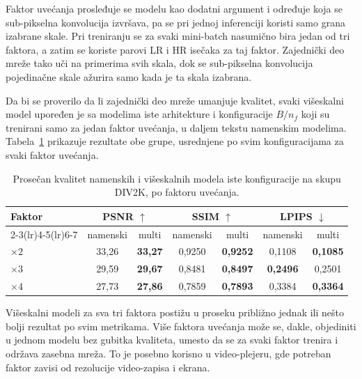 \documentclass[12pt,a4paper]{article}
\begin{document}
Faktor uvećanja prosleđuje se modelu kao dodatni argument i određuje koja se sub-pikselna konvolucija izvršava, pa se pri jednoj inferenciji koristi samo grana izabrane skale. Pri treniranju se za svaki mini-batch nasumično bira jedan od tri faktora, a zatim se koriste parovi LR i HR isečaka za taj faktor. Zajednički deo mreže tako uči na primerima svih skala, dok se sub-pikselna konvolucija pojedinačne skale ažurira samo kada je ta skala izabrana.

Da bi se proverilo da li zajednički deo mreže umanjuje kvalitet, svaki višeskalni model upoređen je sa modelima iste arhitekture i konfiguracije $B/n_f$ koji su trenirani samo za jedan faktor uvećanja, u daljem tekstu namenskim modelima. Tabela~\ref{tab:multiscale_DIV2K} prikazuje rezultate obe grupe, usrednjene po svim konfiguracijama za svaki faktor uvećanja.

\begin{table}[H]
	\centering
	\begingroup
	\small
	\setlength{\tabcolsep}{8pt}
	\renewcommand{\arraystretch}{1.15}
	\begin{tabular}{@{}lcccccc@{}}
		\toprule
		Faktor & \multicolumn{2}{c}{PSNR $\uparrow$} & \multicolumn{2}{c}{SSIM $\uparrow$} & \multicolumn{2}{c}{LPIPS $\downarrow$} \\
		\cmidrule(lr){2-3}\cmidrule(lr){4-5}\cmidrule(lr){6-7}
		& namenski & multi & namenski & multi & namenski & multi \\
		\midrule
		$\times2$ & 33,26 & \textbf{33,27} & 0,9250 & \textbf{0,9252} & 0,1108 & \textbf{0,1085} \\
		$\times3$ & 29,59 & \textbf{29,67} & 0,8481 & \textbf{0,8497} & \textbf{0,2496} & 0,2501 \\
		$\times4$ & 27,73 & \textbf{27,86} & 0,7859 & \textbf{0,7893} & 0,3384 & \textbf{0,3364} \\
		\bottomrule
	\end{tabular}
	\endgroup
	\caption{Prosečan kvalitet namenskih i višeskalnih modela iste konfiguracije na skupu DIV2K, po faktoru uvećanja.}
	\label{tab:multiscale_DIV2K}
\end{table}

Višeskalni modeli za sva tri faktora postižu u proseku približno jednak ili nešto bolji rezultat po svim metrikama. Više faktora uvećanja može se, dakle, objediniti u jednom modelu bez gubitka kvaliteta, umesto da se za svaki faktor trenira i održava zasebna mreža. To je posebno korisno u video-plejeru, gde potreban faktor zavisi od rezolucije video-zapisa i ekrana.
\end{document}
